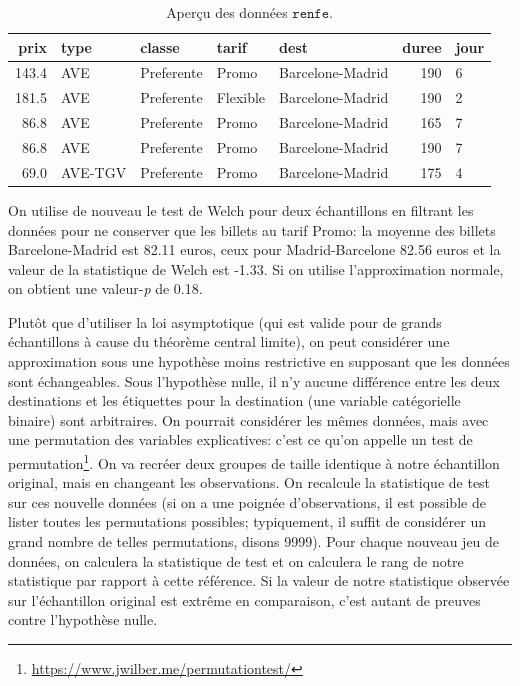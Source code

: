 \documentclass[
  11pt,
  letterpaper,
]{article}
\renewcommand{\href}[2]{#2\footnote{\url{#1}}}
\theoremstyle{definition}
\theoremstyle{definition}
\theoremstyle{definition}
\theoremstyle{definition}
\theoremstyle{remark}
\begin{document}
\begin{table}

\caption{\label{tab:renfetest}Aperçu des données $\texttt{renfe}$.}
\centering
\begin{tabular}[t]{rllllrl}
\toprule
prix & type & classe & tarif & dest & duree & jour\\
\midrule
143.4 & AVE & Preferente & Promo & Barcelone-Madrid & 190 & 6\\
181.5 & AVE & Preferente & Flexible & Barcelone-Madrid & 190 & 2\\
86.8 & AVE & Preferente & Promo & Barcelone-Madrid & 165 & 7\\
86.8 & AVE & Preferente & Promo & Barcelone-Madrid & 190 & 7\\
69.0 & AVE-TGV & Preferente & Promo & Barcelone-Madrid & 175 & 4\\
\bottomrule
\end{tabular}
\end{table}

On utilise de nouveau le test de Welch pour deux échantillons en filtrant les données pour ne conserver que les billets au tarif Promo: la moyenne des billets Barcelone-Madrid est 82.11 euros, ceux pour Madrid-Barcelone 82.56 euros et la valeur de la statistique de Welch est -1.33. Si on utilise l'approximation normale, on obtient une valeur-\emph{p} de 0.18.

Plutôt que d'utiliser la loi asymptotique (qui est valide pour de grands échantillons à cause du théorème central limite), on peut considérer une approximation sous une hypothèse moins restrictive en supposant que les données sont échangeables. Sous l'hypothèse nulle, il n'y aucune différence entre les deux destinations et les étiquettes pour la destination (une variable catégorielle binaire) sont arbitraires. On pourrait considérer les mêmes données, mais avec une permutation des variables explicatives: c'est ce qu'on appelle un \href{https://www.jwilber.me/permutationtest/}{test de permutation}. On va recréer deux groupes de taille identique à notre échantillon original, mais en changeant les observations. On recalcule la statistique de test sur ces nouvelle données (si on a une poignée d'observations, il est possible de lister toutes les permutations possibles; typiquement, il suffit de considérer un grand nombre de telles permutations, disons 9999). Pour chaque nouveau jeu de données, on calculera la statistique de test et on calculera le rang de notre statistique par rapport à cette référence. Si la valeur de notre statistique observée sur l'échantillon original est extrême en comparaison, c'est autant de preuves contre l'hypothèse nulle.
\end{document}
